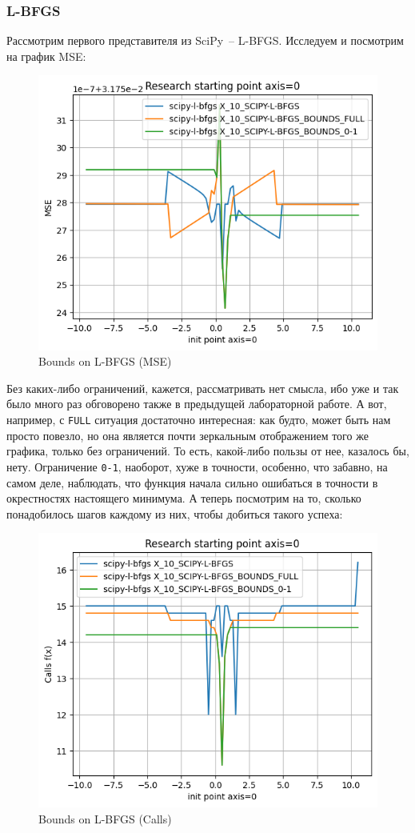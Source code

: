 \documentclass[12pt, a4paper, oneside, final]{article}
\begin{document}
	\subsubsection*{L-BFGS}
	Рассмотрим первого представителя из SciPy~-- L-BFGS.
	Исследуем и посмотрим на график MSE:
	\begin{figure}[H]
		\centering
		\includegraphics[scale = 1]{Image/T2C_L-BFGS_MSE.png}
		\caption*{Bounds on L-BFGS (MSE)}
	\end{figure}
	Без каких-либо ограничений, кажется, рассматривать нет смысла, ибо уже и так было много раз обговорено также в предыдущей лабораторной работе.
	А вот, например, с \texttt{FULL} ситуация достаточно интересная: как будто, может быть нам просто повезло, но она является почти зеркальным отображением того же графика, только без ограничений.
	То есть, какой-либо пользы от нее, казалось бы, нету.
	Ограничение \texttt{0-1}, наоборот, хуже в точности, особенно, что забавно, на самом деле, наблюдать, что функция начала сильно ошибаться в точности в окрестностях настоящего минимума.
	А теперь посмотрим на то, сколько понадобилось шагов каждому из них, чтобы добиться такого успеха:
	\begin{figure}[H]
		\centering
		\includegraphics[scale = 1]{Image/T2C_L-BFGS_CALLS.png}
		\caption*{Bounds on L-BFGS (Calls)}
	\end{figure}
\end{document}
